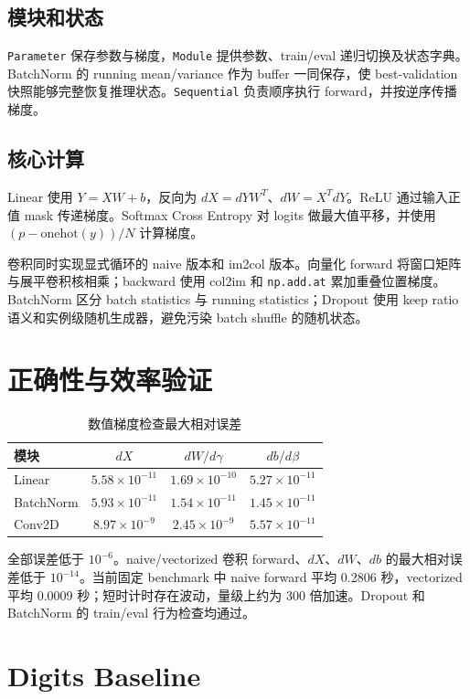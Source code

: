 \documentclass[UTF8,a4paper,11pt]{ctexart}
\begin{document}
\subsection{模块和状态}

\texttt{Parameter} 保存参数与梯度，\texttt{Module} 提供参数、train/eval 递归切换及状态字典。BatchNorm 的 running mean/variance 作为 buffer 一同保存，使 best-validation 快照能够完整恢复推理状态。\texttt{Sequential} 负责顺序执行 forward，并按逆序传播梯度。

\subsection{核心计算}

Linear 使用 $Y=XW+b$，反向为 $dX=dYW^T$、$dW=X^TdY$。ReLU 通过输入正值 mask 传递梯度。Softmax Cross Entropy 对 logits 做最大值平移，并使用 $(p-\mathrm{onehot}(y))/N$ 计算梯度。

卷积同时实现显式循环的 naive 版本和 im2col 版本。向量化 forward 将窗口矩阵与展平卷积核相乘；backward 使用 col2im 和 \texttt{np.add.at} 累加重叠位置梯度。BatchNorm 区分 batch statistics 与 running statistics；Dropout 使用 keep ratio 语义和实例级随机生成器，避免污染 batch shuffle 的随机状态。
\section{正确性与效率验证}

\begin{table}[H]
\centering
\caption{数值梯度检查最大相对误差}
\begin{tabular}{lccc}
\toprule
模块 & $dX$ & $dW/d\gamma$ & $db/d\beta$ \\
\midrule
Linear & $5.58\times10^{-11}$ & $1.69\times10^{-10}$ & $5.27\times10^{-11}$ \\
BatchNorm & $5.93\times10^{-11}$ & $1.54\times10^{-11}$ & $1.45\times10^{-11}$ \\
Conv2D & $8.97\times10^{-9}$ & $2.45\times10^{-9}$ & $5.57\times10^{-11}$ \\
\bottomrule
\end{tabular}
\end{table}

全部误差低于 $10^{-6}$。naive/vectorized 卷积 forward、$dX$、$dW$、$db$ 的最大相对误差低于 $10^{-14}$。当前固定 benchmark 中 naive forward 平均 0.2806 秒，vectorized 平均 0.0009 秒；短时计时存在波动，量级上约为 300 倍加速。Dropout 和 BatchNorm 的 train/eval 行为检查均通过。

\section{Digits Baseline}
\end{document}
